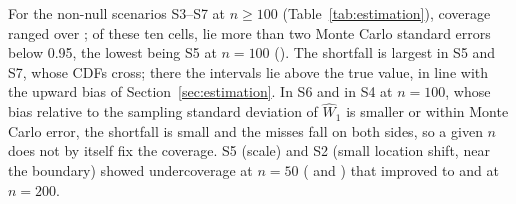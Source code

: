 \documentclass[AMA,Times1COL]{WileyNJDv5}
\begin{document}
For the non-null scenarios S3--S7 at $n \geq 100$ (Table~\ref{tab:estimation}), coverage ranged over ; of these ten cells,  lie more than two Monte Carlo standard errors below 0.95, the lowest being S5 at $n = 100$ (). The shortfall is largest in S5 and S7, whose CDFs cross; there the intervals lie above the true value, in line with the upward bias of Section~\ref{sec:estimation}. In S6 and in S4 at $n = 100$, whose bias relative to the sampling standard deviation of $\widehat{W}_1$ is smaller or within Monte Carlo error, the shortfall is small and the misses fall on both sides, so a given $n$ does not by itself fix the coverage. S5 (scale) and S2 (small location shift, near the boundary) showed undercoverage at $n=50$ ( and ) that improved to  and  at $n=200$.
\end{document}

